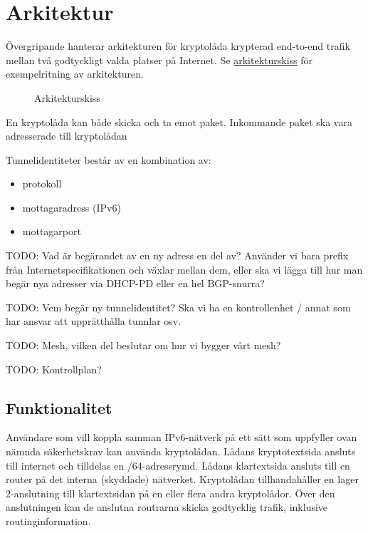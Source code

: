 \documentclass[12pt,a4paper]{article}
\providecommand{\tightlist}{%
  \setlength{\itemsep}{2pt}\setlength{\parskip}{0pt}\setlength{\partopsep}{2pt}\setlength{\topsep}{2pt}}
\begin{document}
\section{Arkitektur}\label{arkitektur}

Övergripande hanterar arkitekturen för kryptolåda krypterad end-to-end
trafik mellan två godtyckligt valda platser på Internet. Se
\hyperref[arkitektur]{arkitekturskiss} för exempelritning av
arkitekturen.

\begin{figure}
\centering

\caption{Arkitekturskiss}
\end{figure}

En kryptolåda kan både skicka och ta emot paket. Inkommande paket ska
vara adresserade till kryptolådan

Tunnelidentiteter består av en kombination av:

\begin{itemize}
\tightlist
\item
  protokoll
\item
  mottagaradress (IPv6)
\item
  mottagarport
\end{itemize}

TODO: Vad är begärandet av en ny adress en del av? Använder vi bara
prefix från Internetspecifikationen och växlar mellan dem, eller ska vi
lägga till hur man begär nya adresser via DHCP-PD eller en hel
BGP-snurra?

TODO: Vem begär ny tunnelidentitet? Ska vi ha en kontrollenhet / annat
som har ansvar att upprätthålla tunnlar osv.

TODO: Mesh, vilken del beslutar om hur vi bygger vårt mesh?

TODO: Kontrollplan?

\subsection{Funktionalitet}\label{funktionalitet}

Användare som vill koppla samman IPv6-nätverk på ett sätt som uppfyller
ovan nämnda säkerhetskrav kan använda kryptolådan. Lådans kryptotextsida
ansluts till internet och tilldelas en /64-adressrymd. Lådans
klartextsida ansluts till en router på det interna (skyddade) nätverket.
Kryptolådan tillhandahåller en lager 2-anslutning till klartextsidan på
en eller flera andra kryptolådor. Över den anslutningen kan de anslutna
routrarna skicka godtycklig trafik, inklusive routinginformation.
\end{document}
